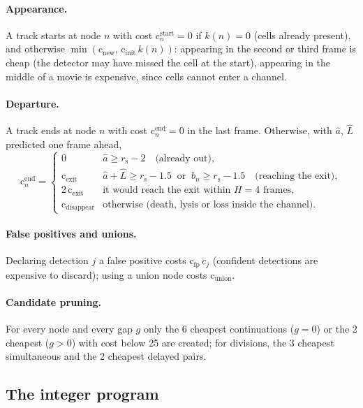 \documentclass[11pt,a4paper]{article}
\newcommand{\rs}{r_{\mathrm{s}}}     %
\newcommand{\cost}{\mathrm{c}}
\begin{document}
\paragraph{Appearance.} A track starts at node $n$ with cost $\cost^{\mathrm{start}}_n=0$ if $k(n)=0$ (cells already present), and otherwise $\min(\cost_{\mathrm{new}},\,\cost_{\mathrm{init}}\,k(n))$: appearing in the second or third frame is cheap (the detector may have missed the cell at the start), appearing in the middle of a movie is expensive, since cells cannot enter a channel.

\paragraph{Departure.} A track ends at node $n$ with cost $\cost^{\mathrm{end}}_n=0$ in the last frame. Otherwise, with $\hat a$, $\hat L$ predicted one frame ahead,
\begin{equation}
\cost^{\mathrm{end}}_n=\begin{cases}
0 & \hat a\ge\rs-2 \quad\text{(already out)},\\
\cost_{\mathrm{exit}} & \hat a+\hat L\ge\rs-1.5\ \text{ or }\ b_n\ge\rs-1.5\quad\text{(reaching the exit)},\\
2\,\cost_{\mathrm{exit}} & \text{it would reach the exit within $H=4$ frames},\\
\cost_{\mathrm{disappear}} & \text{otherwise (death, lysis or loss inside the channel).}
\end{cases}
\end{equation}

\paragraph{False positives and unions.} Declaring detection $j$ a false positive costs $\cost_{\mathrm{fp}}\,c_j$ (confident detections are expensive to discard); using a union node costs $\cost_{\mathrm{union}}$.

\paragraph{Candidate pruning.} For every node and every gap $g$ only the 6 cheapest continuations ($g=0$) or the 2 cheapest ($g>0$) with cost below 25 are created; for divisions, the 3 cheapest simultaneous and the 2 cheapest delayed pairs.

\subsection{The integer program}\label{sec:ilp}
\end{document}
